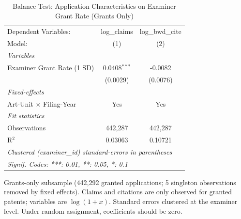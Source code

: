 
\begin{table}[htbp]
   \caption{\label{tab:balance} Balance Test: Application Characteristics on Examiner Grant Rate (Grants Only)}
   \centering
   \begin{tabular}{lcc}
      \tabularnewline \midrule \midrule
      Dependent Variables:           & log\_claims    & log\_bwd\_cite\\    
      Model:                         & (1)            & (2)\\  
      \midrule
      \emph{Variables}\\
      Examiner Grant Rate (1 SD)     & 0.0408$^{***}$ & -0.0082\\   
                                     & (0.0029)       & (0.0076)\\   
      \midrule
      \emph{Fixed-effects}\\
      Art-Unit $\times$ Filing-Year  & Yes            & Yes\\  
      \midrule
      \emph{Fit statistics}\\
      Observations                   & 442,287        & 442,287\\  
      R$^2$                          & 0.03063        & 0.10721\\  
      \midrule \midrule
      \multicolumn{3}{l}{\emph{Clustered (examiner\_id) standard-errors in parentheses}}\\
      \multicolumn{3}{l}{\emph{Signif. Codes: ***: 0.01, **: 0.05, *: 0.1}}\\
   \end{tabular}
   
   \par \raggedright 
   Grants-only subsample (442,292 granted applications; 5 singleton observations removed by fixed effects). Claims and citations are only observed for granted patents; variables are $\log(1 + x)$. Standard errors clustered at the examiner level. Under random assignment, coefficients should be zero.
\end{table}


